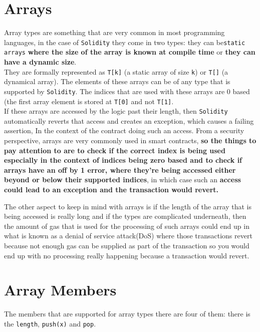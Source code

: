 \section{Arrays}
Array types are something that are very common in most programming languages, in the case of \texttt{Solidity} they come in two types: they can be\linebreak\texttt{static arrays} \textbf{where the size of the array is known at compile time} or \textbf{they can have a dynamic size}.\\

They are formally represented as \texttt{T[k]} (a static array of size \texttt{k}) or \texttt{T[]} (a dynamical array). The elements of these arrays can be of any type that is supported by \texttt{Solidity}. The indices that are used with these arrays are 0 based (the first array element is stored at \texttt{T[0]} and not \texttt{T[1]}.\\ 

If these arrays are accessed by the logic past their length, then \texttt{Solidity} automatically reverts that access and creates an exception, which causes a failing assertion, In the context of the contract doing such an access. From a security perspective, arrays are very commonly used in smart contracts, \textbf{so the things to pay attention to are to check if the correct index is being used especially in the context of indices being zero based and to check if arrays have an off by 1 error, where they're being accessed either beyond or below their supported indices}, in which case such an \textbf{access could lead to an exception and the transaction would revert.}

The other aspect to keep in mind with arrays is if the length of the array that is being accessed is really long and if the types are complicated underneath, then the amount of gas that is used for the processing of such arrays could end up in what is known as a denial of service attack(DoS) where those transactions revert because not enough gas can be supplied as part of the transaction so you would end up with no processing really happening because a transaction would revert.

\section{Array Members}
The members that are supported for array types there are four of them: there is the \texttt{length}, \texttt{push(x)} and \texttt{pop}. 

